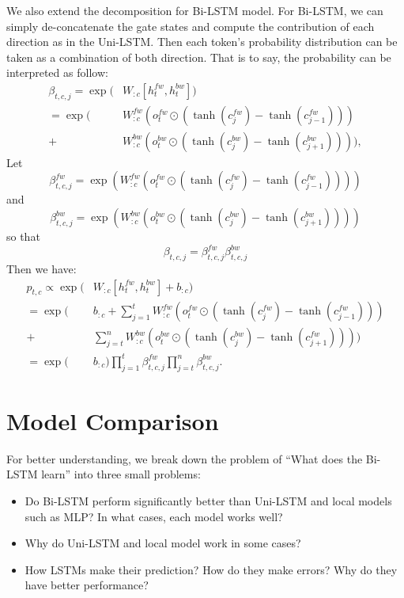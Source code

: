 \documentclass{article}
\begin{document}
We also extend the decomposition for Bi-LSTM model. For Bi-LSTM, we can simply de-concatenate the gate states and compute the contribution of each direction as in the Uni-LSTM. Then each token's probability distribution can be taken as a combination of both direction. That is to say, the probability can be interpreted as follow:
\begin{align}\label{eq:bi-beta} 
\beta_{t, c, j} = \exp(&W_{:c} [h_t^{fw}, h_t^{bw}])\\
= \exp(&W_{:c}^{fw} (o_t^{fw} \odot (\tanh(c_j^{fw})- \tanh(c_{j-1}^{fw}))) \\
+ &W_{:c}^{bw} (o_t^{bw} \odot (\tanh(c_j^{bw})- \tanh(c_{j+1}^{bw})))),
\end{align}
Let
\begin{equation}
\beta_{t, c, j}^{fw} = \exp(W_{:c}^{fw} (o_t^{fw} \odot (\tanh(c_j^{fw})- \tanh(c_{j-1}^{fw}))))
\end{equation}
and
\begin{equation}
\beta_{t, c, j}^{bw} = \exp(W_{:c}^{bw} (o_t^{bw} \odot (\tanh(c_j^{bw})- \tanh(c_{j+1}^{bw}))))
\end{equation}
so that 
\begin{equation}
\beta_{t, c, j} = \beta_{t, c, j}^{fw} \beta_{t, c, j}^{bw}
\end{equation}
Then we have:
\begin{align}
p_{t, c} \propto \exp(&W_{:c} [h_t^{fw}, h_t^{bw}] + b_{:c}) \\
= \exp(&b_{:c} + \sum_{j=1}^t W_{:c}^{fw} (o_t^{fw} \odot (\tanh(c_j^{fw}) - \tanh(c_{j-1}^{fw})))\\
	+&\sum_{j=t}^n W_{:c}^{bw} (o_t^{bw} \odot (\tanh(c_j^{bw}) - \tanh(c_{j+1}^{fw}))))\\
=  \exp(&b_{:c})\prod_{j=1}^t \beta_{t, c, j}^{fw} \prod_{j=t}^n \beta_{t, c, j}^{bw}.
\end{align}

\section{Model Comparison} \label{sec:question}

For better understanding, we break down the problem of ``What does the Bi-LSTM learn'' into three small problems:

\begin{itemize}
	\item Do Bi-LSTM perform significantly better than Uni-LSTM and local models such as MLP? 
	In what cases, each model works well?
	\item Why do Uni-LSTM and local model work in some cases? 
	\item How LSTMs make their prediction? How do they make errors? Why do they have better performance?%
\end{itemize}
\end{document}
